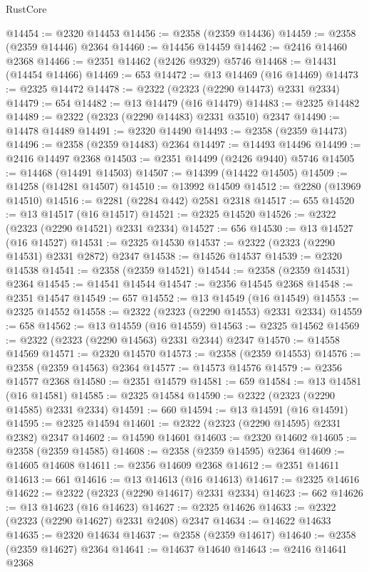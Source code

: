 \begin{lexlean}{RustCore}
\begin{coremodule}
@14454 := @2320 @14453
@14456 := @2358 (@2359 @14436)
@14459 := @2358 (@2359 @14446) @2364
@14460 := @14456 @14459
@14462 := @2416 @14460 @2368
@14466 := @2351 @14462 (@2426 @9329) @5746
@14468 := @14431 (@14454 @14466)
@14469 := 653
@14472 := @13 @14469 (@16 @14469)
@14473 := @2325 @14472
@14478 := @2322 (@2323 (@2290 @14473) @2331 @2334)
@14479 := 654
@14482 := @13 @14479 (@16 @14479)
@14483 := @2325 @14482
@14489 := @2322 (@2323 (@2290 @14483) @2331 @3510) @2347
@14490 := @14478 @14489
@14491 := @2320 @14490
@14493 := @2358 (@2359 @14473)
@14496 := @2358 (@2359 @14483) @2364
@14497 := @14493 @14496
@14499 := @2416 @14497 @2368
@14503 := @2351 @14499 (@2426 @9440) @5746
@14505 := @14468 (@14491 @14503)
@14507 := @14399 (@14422 @14505)
@14509 := @14258 (@14281 @14507)
@14510 := @13992 @14509
@14512 := @2280 (@13969 @14510)
@14516 := @2281 (@2284 @442) @2581 @2318
@14517 := 655
@14520 := @13 @14517 (@16 @14517)
@14521 := @2325 @14520
@14526 := @2322 (@2323 (@2290 @14521) @2331 @2334)
@14527 := 656
@14530 := @13 @14527 (@16 @14527)
@14531 := @2325 @14530
@14537 := @2322 (@2323 (@2290 @14531) @2331 @2872) @2347
@14538 := @14526 @14537
@14539 := @2320 @14538
@14541 := @2358 (@2359 @14521)
@14544 := @2358 (@2359 @14531) @2364
@14545 := @14541 @14544
@14547 := @2356 @14545 @2368
@14548 := @2351 @14547
@14549 := 657
@14552 := @13 @14549 (@16 @14549)
@14553 := @2325 @14552
@14558 := @2322 (@2323 (@2290 @14553) @2331 @2334)
@14559 := 658
@14562 := @13 @14559 (@16 @14559)
@14563 := @2325 @14562
@14569 := @2322 (@2323 (@2290 @14563) @2331 @2344) @2347
@14570 := @14558 @14569
@14571 := @2320 @14570
@14573 := @2358 (@2359 @14553)
@14576 := @2358 (@2359 @14563) @2364
@14577 := @14573 @14576
@14579 := @2356 @14577 @2368
@14580 := @2351 @14579
@14581 := 659
@14584 := @13 @14581 (@16 @14581)
@14585 := @2325 @14584
@14590 := @2322 (@2323 (@2290 @14585) @2331 @2334)
@14591 := 660
@14594 := @13 @14591 (@16 @14591)
@14595 := @2325 @14594
@14601 := @2322 (@2323 (@2290 @14595) @2331 @2382) @2347
@14602 := @14590 @14601
@14603 := @2320 @14602
@14605 := @2358 (@2359 @14585)
@14608 := @2358 (@2359 @14595) @2364
@14609 := @14605 @14608
@14611 := @2356 @14609 @2368
@14612 := @2351 @14611
@14613 := 661
@14616 := @13 @14613 (@16 @14613)
@14617 := @2325 @14616
@14622 := @2322 (@2323 (@2290 @14617) @2331 @2334)
@14623 := 662
@14626 := @13 @14623 (@16 @14623)
@14627 := @2325 @14626
@14633 := @2322 (@2323 (@2290 @14627) @2331 @2408) @2347
@14634 := @14622 @14633
@14635 := @2320 @14634
@14637 := @2358 (@2359 @14617)
@14640 := @2358 (@2359 @14627) @2364
@14641 := @14637 @14640
@14643 := @2416 @14641 @2368

\end{coremodule}
\end{lexlean}
